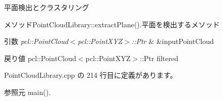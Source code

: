 平面検出とクラスタリング 

メソッド\-Point\-Cloud\-Library\-::extract\-Plane().平面を検出するメソッド


\begin{DoxyParams}{引数}
{\em pcl\-::\-Point\-Cloud$<$pcl\-::\-Point\-X\-Y\-Z$>$\-::\-Ptr} & \&input\-Point\-Cloud \\
\hline
\end{DoxyParams}
\begin{DoxyReturn}{戻り値}
pcl\-::\-Point\-Cloud$<$pcl\-::\-Point\-X\-Y\-Z$>$\-::\-Ptr filtered 
\end{DoxyReturn}


 Point\-Cloud\-Library.\-cpp の 214 行目に定義があります。



参照元 main().


